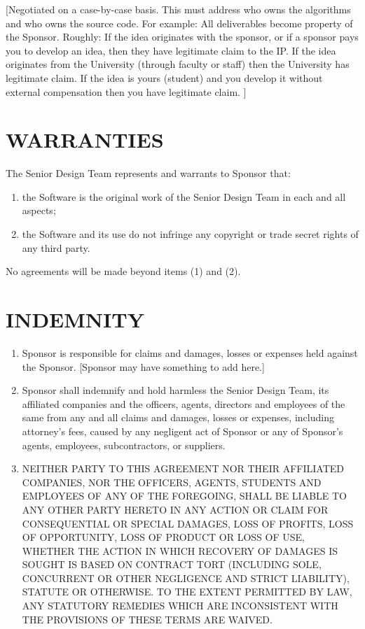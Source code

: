 \documentclass[11pt]{article}
\begin{document}
[Negotiated on a case-by-case basis. This must address who owns the algorithms and who owns the source code. For example: All deliverables become property of the Sponsor. Roughly:  If the idea originates with the sponsor, or if a sponsor pays you to develop an idea, then they have legitimate claim to the IP.  If the idea originates from the University (through faculty or staff) then the University has legitimate claim. If the idea is yours (student) and you develop it without external compensation then you have legitimate claim. ] 

\section{WARRANTIES }  

The Senior Design Team represents and warrants to Sponsor that:         
\begin{enumerate}  \itemsep4pt \parskip0pt 
\item  the Software is the original work of the Senior Design Team in each and all aspects;        

\item the Software and its use do not infringe any copyright or   trade secret rights of any third party.  
\end{enumerate}
No agreements will be made beyond items (1) and (2).

\section{INDEMNITY}   
\begin{enumerate}  \itemsep4pt \parskip0pt 
\item Sponsor is responsible for claims and damages, losses or expenses held against the Sponsor. [Sponsor may have something to add here.]

\item  Sponsor shall       indemnify and hold harmless the Senior Design Team, its affiliated companies       and the officers, agents, directors and employees of the same from       any and all claims and damages, losses or expenses, including       attorney's fees, caused by any negligent act of Sponsor or any of       Sponsor's agents, employees, subcontractors, or suppliers.    

\item  NEITHER PARTY TO THIS AGREEMENT NOR THEIR AFFILIATED COMPANIES,       NOR THE OFFICERS, AGENTS, STUDENTS AND EMPLOYEES OF ANY OF THE       FOREGOING, SHALL BE LIABLE TO ANY OTHER PARTY HERETO IN ANY ACTION       OR CLAIM FOR CONSEQUENTIAL OR SPECIAL DAMAGES, LOSS OF PROFITS,       LOSS OF OPPORTUNITY, LOSS OF PRODUCT OR LOSS OF USE, WHETHER THE       ACTION IN WHICH RECOVERY OF DAMAGES IS SOUGHT IS BASED ON CONTRACT       TORT (INCLUDING SOLE, CONCURRENT OR OTHER NEGLIGENCE AND STRICT       LIABILITY), STATUTE OR OTHERWISE. TO THE EXTENT PERMITTED BY LAW,       ANY STATUTORY REMEDIES WHICH ARE INCONSISTENT WITH THE PROVISIONS       OF THESE TERMS ARE WAIVED.  
\end{enumerate}
\end{document}
